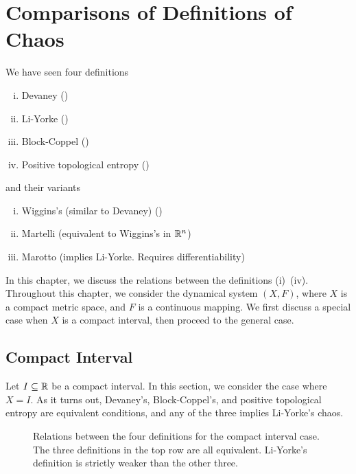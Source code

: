 \documentclass[12pt,twoside,draft]{book}
\begin{document}
\chapter{Comparisons of Definitions of Chaos}
We have seen four definitions 
\begin{enumerate}[(i)]
  \item Devaney (\dev)
  \item Li-Yorke (\liy)
  \item Block-Coppel (\blcp)
  \item Positive topological entropy (\pte)
\end{enumerate}
and their variants
\begin{enumerate}[(i)]
  \item Wiggins's (similar to Devaney) (\wig)
  \item Martelli (equivalent to Wiggins's in $\mathbb{R}^n$)
  \item Marotto (implies Li-Yorke. Requires differentiability)
\end{enumerate}
In this chapter, we discuss the relations between the definitions (i)~(iv).
Throughout this chapter, we consider the dynamical system $(X,F)$, where $X$ is a compact metric space, and $F$ is a continuous mapping.
We first discuss a special case when $X$ is a compact interval, then proceed to the general case.

\section{Compact Interval}
Let $I \subseteq \mathbb{R}$ be a compact interval.
In this section, we consider the case where $X = I$.
As it turns out, Devaney's, Block-Coppel's, and positive topological entropy are equivalent conditions, and any of the three implies Li-Yorke's chaos.
\begin{figure}[ht]
  \label{fig:chaos-interval}
  \caption{
    Relations between the four definitions for the compact interval case.
    The three definitions in the top row are all equivalent.
    Li-Yorke's definition is strictly weaker than the other three.
  }
\end{figure}
\end{document}
